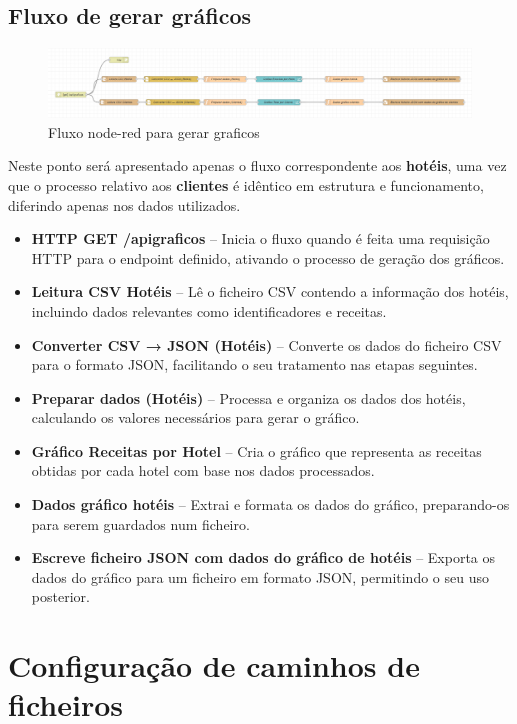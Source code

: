 \documentclass[a4paper, 12pt]{article} %
\begin{document}
\subsection{Fluxo de gerar gráficos}
\begin{figure}[H] 
	\centering 
	\includegraphics[width=1\textwidth]{images/node-red_graficos.png}
	\caption{Fluxo node-red para gerar graficos}
	\label{fig:node-red_gerar_graficos}
\end{figure}

Neste ponto será apresentado apenas o fluxo correspondente aos \textbf{hotéis}, uma vez que o processo relativo aos \textbf{clientes} é idêntico em estrutura e funcionamento, diferindo apenas nos dados utilizados.  

\begin{itemize}
	\item \textbf{HTTP GET /apigraficos} – Inicia o fluxo quando é feita uma requisição HTTP para o endpoint definido, ativando o processo de geração dos gráficos.
	\item \textbf{Leitura CSV Hotéis} – Lê o ficheiro CSV contendo a informação dos hotéis, incluindo dados relevantes como identificadores e receitas.
	\item \textbf{Converter CSV → JSON (Hotéis)} – Converte os dados do ficheiro CSV para o formato JSON, facilitando o seu tratamento nas etapas seguintes.
	\item \textbf{Preparar dados (Hotéis)} – Processa e organiza os dados dos hotéis, calculando os valores necessários para gerar o gráfico.
	\item \textbf{Gráfico Receitas por Hotel} – Cria o gráfico que representa as receitas obtidas por cada hotel com base nos dados processados.
	\item \textbf{Dados gráfico hotéis} – Extrai e formata os dados do gráfico, preparando-os para serem guardados num ficheiro.
	\item \textbf{Escreve ficheiro JSON com dados do gráfico de hotéis} – Exporta os dados do gráfico para um ficheiro em formato JSON, permitindo o seu uso posterior.
\end{itemize}

\newpage

\section{Configuração de caminhos de ficheiros}
\end{document}
